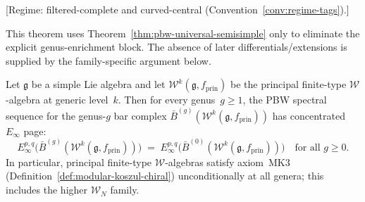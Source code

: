 \begin{theorem}
\label{thm:pbw-allgenera-principal-w}
\textup{[Regime: filtered-complete and curved-central
\textup{(}Convention~\textup{\ref{conv:regime-tags})}.]}

This theorem uses Theorem~\ref{thm:pbw-universal-semisimple} only to eliminate
the explicit genus-enrichment block.  The absence of later differentials/extensions
is supplied by the family-specific argument below.

Let $\mathfrak{g}$ be a simple Lie algebra and let
$\mathcal{W}^k(\mathfrak{g}, f_{\mathrm{prin}})$ be the principal
finite-type $\mathcal{W}$-algebra at generic level~$k$.
Then for every genus~$g \geq 1$, the PBW spectral sequence for the
genus-$g$ bar complex
$\bar{B}^{(g)}(\mathcal{W}^k(\mathfrak{g}, f_{\mathrm{prin}}))$
has concentrated $E_\infty$ page:
\[
E_\infty^{p,q}\bigl(\bar{B}^{(g)}(\mathcal{W}^k(\mathfrak{g}, f_{\mathrm{prin}}))\bigr)
\;=\;
E_\infty^{p,q}\bigl(\bar{B}^{(0)}(\mathcal{W}^k(\mathfrak{g}, f_{\mathrm{prin}}))\bigr)
\quad \text{for all } g \geq 0.
\]
In particular, principal finite-type $\mathcal{W}$-algebras satisfy
axiom~\textup{MK3}
\textup{(}Definition~\textup{\ref{def:modular-koszul-chiral})}
unconditionally at all genera; this includes the higher
$\mathcal{W}_N$ family.
\end{theorem}

